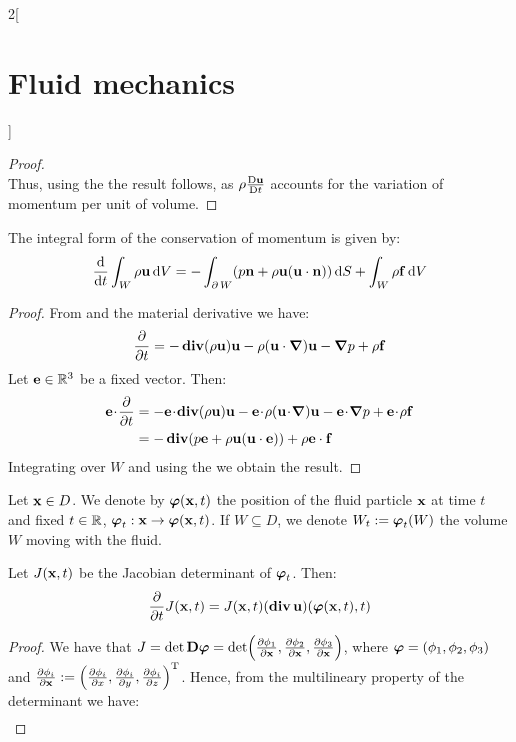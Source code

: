 \documentclass[../../../main_physics.tex]{subfiles}
\begin{document}
\begin{multicols}{2}[\section{Fluid mechanics}]
\begin{proof}
$$    $$
    Thus, using the  the result follows, as $\rho\frac{\mathrm{D}\boldsymbol{\mathrm{u}}}{\mathrm{D}t}$ accounts for the variation of momentum per unit of volume.
  \end{proof}
  \begin{corollary}
    The integral form of the conservation of momentum is given by:
    $$
      \dv{}{t}\int_W\rho\boldsymbol{\mathrm{u}}\dd{V}=-\int_{\operatorname{\partial}{W}}(p\boldsymbol{\mathrm{n}}+\rho\boldsymbol{\mathrm{u}}(\boldsymbol{\mathrm{u}}\cdot\boldsymbol{\mathrm{n}}))\dd{S}+\int_W\rho\boldsymbol{\mathrm{f}}\dd{V}
    $$
  \end{corollary}
  \begin{proof}
    From  and the material derivative we have:
    $$
      \pdv{}{t}(\rho\boldsymbol{\mathrm{u}})=-\operatorname{\boldsymbol{\mathrm{div}}}(\rho\boldsymbol{\mathrm{u}})\boldsymbol{\mathrm{u}}-\rho(\boldsymbol{\mathrm{u}}\cdot \grad )\boldsymbol{\mathrm{u}}-\grad p+\rho\boldsymbol{\mathrm{f}}
    $$
    Let $\boldsymbol{\mathrm{e}}\in\mathbb{R}^3$ be a fixed vector. Then:
    \begin{align*}
      \vf{e}\!\cdot\! \pdv{}{t}(\rho\vf{u}) & =-\vf{e}\!\cdot\!\div(\rho\vf{u})\vf{u}-\vf{e}\!\cdot\!\rho(\vf{u}\!\cdot\! \grad) \vf{u}-\vf{e}\!\cdot\!\grad p+\vf{e}\!\cdot\!\rho\vf{f} \\
                                            & =-\div(p\vf{e}+\rho \vf{u}(\vf{u}\cdot\vf{e}))+\rho\vf{e}\cdot\vf{f}
    \end{align*}
    Integrating over $W$ and using the  we obtain the result.
  \end{proof}
  \begin{definition}
    Let $\boldsymbol{\mathrm{x}}\in D$. We denote by $\boldsymbol{\mathrm{\varphi}}(\boldsymbol{\mathrm{x}},t)$ the position of the fluid particle $\boldsymbol{\mathrm{x}}$ at time $t$ and fixed $t\in \mathbb{R}$, $\boldsymbol{\mathrm{\varphi}}_t:\boldsymbol{\mathrm{x}}\to\boldsymbol{\mathrm{\varphi}}(\boldsymbol{\mathrm{x}},t)$. If $W\subseteq D$, we denote $W_t:=\boldsymbol{\mathrm{\varphi}}_t(W)$ the volume $W$ moving with the fluid.
  \end{definition}
  \begin{lemma}\label{FLM:lemmaJacobian}
    Let $J(\boldsymbol{\mathrm{x}},t)$ be the Jacobian determinant of $\boldsymbol{\mathrm{\varphi}}_t$. Then:
    $$
      \pdv{}{t} J(\boldsymbol{\mathrm{x}},t)=J(\boldsymbol{\mathrm{x}},t)(\operatorname{\boldsymbol{\mathrm{div}}}\boldsymbol{\mathrm{u}})(\boldsymbol{\mathrm{\varphi}}(\boldsymbol{\mathrm{x}},t),t)
    $$
  \end{lemma}
  \begin{proof}
    We have that $J=\det\boldsymbol{\mathrm{D\varphi}} = \det(\pdv{\phi_1}{\boldsymbol{\mathrm{x}}},\pdv{\phi_2}{\boldsymbol{\mathrm{x}}},\pdv{\phi_3}{\boldsymbol{\mathrm{x}}})$, where $\boldsymbol{\mathrm{\varphi}} = (\phi_1,\phi_2,\phi_3)$ and $\pdv{\phi_i}{\boldsymbol{\mathrm{x}}} := {\left(
        \pdv{\phi_i}{x}, \pdv{\phi_i}{y}, \pdv{\phi_i}{z}
        \right)}^{\mathrm{T}}$. Hence, from the multilineary property of the determinant we have:
    \begin{multline}\label{FLM:Jacobian}

\end{multline}
\end{proof}
\end{multicols}
\end{document}
